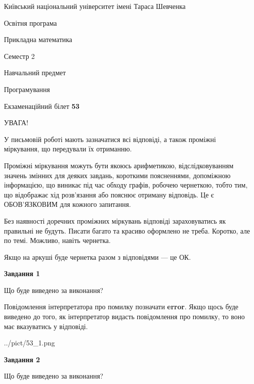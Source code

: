 \documentclass[12pt, ukrainian]{article}
\begin{document}
{{\begin {small}\par
{ \center  Київський національний університет імені Тараса Шевченка \par}
{\parbox {5 cm}{Освітня програма \hfill}{\parbox {7 cm}{Прикладна математика \hfill}}\parbox {6 cm}{\hfill Семестр 2}}\par
{\parbox {5 cm} {Навчальний предмет \hfill}\parbox {7 cm}{Програмування \hfill}\parbox {6cm}{\hfill}\par}\vspace{-7pt} \end{small}}{\center Екзаменаційний білет \No \textbf
{ 53 }\par}}
{
\begin {large}
УВАГА!

У письмовій роботі мають зазначатися всі відповіді, а також проміжні міркування, що передували їх отриманню.

Проміжні міркування можуть бути якоюсь арифметикою, відслідковуванням зна\-чень змінних для деяких завдань,
короткими поясненнями, допоміжною інформацією, що виникає під час обходу графів, робочею чернеткою,
тобто тим, що відображає хід розв’язання або пояснює отриману відповідь.
Це є ОБОВ’ЯЗКОВИМ для кожного запитання.

Без наявності доречних проміжних міркувань відповіді зараховуватись як правиль\-ні не будуть.
Писати багато та красиво оформлено не треба. Коротко, але по темі. Можли\-во, навіть чернетка.

Якщо на аркуші буде чернетка разом з відповідями --- це ОК.

\newpage

{\begin {center}\textbf{Завдання 1}\end {center}}\par
Що буде виведено за виконання?

Повідомлення інтерпретатора про помилку позначати \textbf{error}.
Якщо щось буде виведено до того, як інтерпретатор видасть повідомлення про помилку, 
то воно має вказуватись у відповіді. \par


\begin{center}
	{../pict/53_1.png}
\end{center}
\newpage

{\begin {center}\textbf{Завдання 2}\end {center}}\par
Що буде виведено за виконання?


\end{large}}
\end{document}

